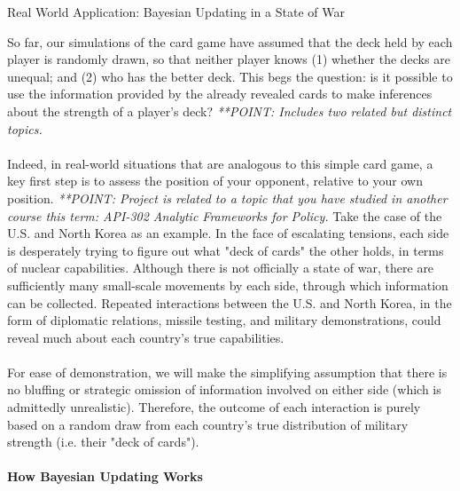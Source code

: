 \documentclass[12pt]{article}
\begin{document}
\begin{center}
Real World Application: Bayesian Updating in a State of War
\end{center}

So far, our simulations of the card game have assumed that the deck held by each player is randomly drawn, so that neither player knows (1) whether the decks are unequal; and (2) who has the better deck. This begs the question: is it possible to use the information provided by the already revealed cards to make inferences about the strength of a player's deck? \textit{**POINT: Includes two related but distinct topics.}\\
\\
Indeed, in real-world situations that are analogous to this simple card game, a key first step is to assess the position of your opponent, relative to your own position. \textit{**POINT: Project is related to a topic that you have studied in another course this term: API-302 Analytic Frameworks for Policy.} Take the case of the U.S. and North Korea as an example. In the face of escalating tensions, each side is desperately trying to figure out what "deck of cards" the other holds, in terms of nuclear capabilities. Although there is not officially a state of war, there are sufficiently many small-scale movements by each side, through which information can be collected. Repeated interactions between the U.S. and North Korea, in the form of diplomatic relations, missile testing, and military demonstrations, could reveal much about each country's true capabilities.\\
\\
For ease of demonstration, we will make the simplifying assumption that there is no bluffing or strategic omission of information involved on either side (which is admittedly unrealistic). Therefore, the outcome of each interaction is purely based on a random draw from each country's true distribution of military strength (i.e. their "deck of cards").\\

\paragraph*{How Bayesian Updating Works}
\end{document}
